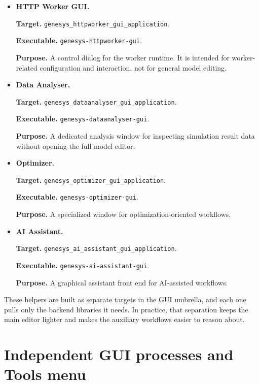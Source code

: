 \begin{itemize}
\item \textbf{HTTP Worker GUI.}

\noindent\textbf{Target.} \texttt{genesys\_httpworker\_gui\_application}.

\noindent\textbf{Executable.} \texttt{genesys-httpworker-gui}.

\noindent\textbf{Purpose.} A control dialog for the worker runtime. It is intended for worker-related configuration and interaction, not for general model editing.

\item \textbf{Data Analyser.}

\noindent\textbf{Target.} \texttt{genesys\_dataanalyser\_gui\_application}.

\noindent\textbf{Executable.} \texttt{genesys-dataanalyser-gui}.

\noindent\textbf{Purpose.} A dedicated analysis window for inspecting simulation result data without opening the full model editor.

\item \textbf{Optimizer.}

\noindent\textbf{Target.} \texttt{genesys\_optimizer\_gui\_application}.

\noindent\textbf{Executable.} \texttt{genesys-optimizer-gui}.

\noindent\textbf{Purpose.} A specialized window for optimization-oriented workflows.

\item \textbf{AI Assistant.}

\noindent\textbf{Target.} \texttt{genesys\_ai\_assistant\_gui\_application}.

\noindent\textbf{Executable.} \texttt{genesys-ai-assistant-gui}.

\noindent\textbf{Purpose.} A graphical assistant front end for AI-assisted workflows.
\end{itemize}

These helpers are built as separate targets in the GUI umbrella, and each one
pulls only the backend libraries it needs. In practice, that separation keeps
the main editor lighter and makes the auxiliary workflows easier to reason
about.

\section{Independent GUI processes and Tools menu}
\label{sec:standalone-tools-process}

